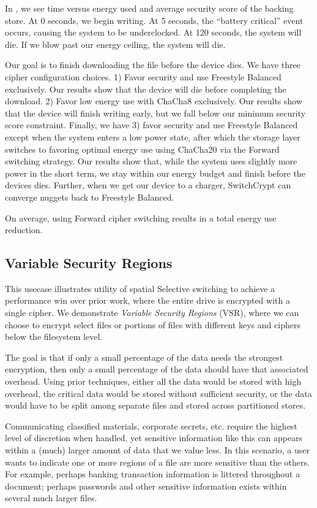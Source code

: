 In , we see time versus energy used and average security
score of the backing store. At 0 seconds, we begin writing. At 5 seconds, the
``battery critical'' event occurs, causing the system to be underclocked. At 120
seconds, the system will die. If we blow past our energy ceiling, the system
will die.

Our goal is to finish downloading the file before the device dies. We have three
cipher configuration choices. 1) Favor security and use Freestyle Balanced
exclusively. Our results show that the device will die before completing the
download. 2) Favor low energy use with ChaCha8 exclusively. Our results show
that the device will finish writing early, but we fall below our minimum
security score constraint. Finally, we have 3) favor security and use Freestyle
Balanced except when the system enters a low power state, after which the
storage layer switches to favoring optimal energy use using ChaCha20 via the
Forward switching strategy. Our results show that, while the system uses
slightly more power in the short term, we stay within our energy budget and
finish before the devices dies. Further, when we get our device to a charger,
SwitchCrypt can converge nuggets back to Freestyle Balanced.

On average, using Forward cipher switching results in a  total energy
use reduction.

\subsection{Variable Security Regions}

This usecase illustrates utility of spatial Selective switching to achieve a
performance win over prior work, where the entire drive is encrypted with a
single cipher. We demonstrate \emph{Variable Security Regions} (VSR), where we
can choose to encrypt select files or portions of files with different keys and
ciphers below the filesystem level. 

The goal is that if only a small percentage
of the data needs the strongest encryption, then only a small percentage of the
data should have that associated overhead.  Using prior techniques, either all 
the data would be stored with high overhead, the critical data would be stored 
without sufficient security, or the data would have to be split among separate 
files and stored across partitioned stores.

Communicating classified materials, corporate secrets, etc. require the highest
level of discretion when handled, yet sensitive information like this can
appears within a (much) larger amount of data that we value less. In this
scenario, a user wants to indicate one or more regions of a file are more
sensitive than the others. For example, perhaps banking transaction information
is littered throughout a document; perhaps passwords and other sensitive
information exists within several much larger files.


